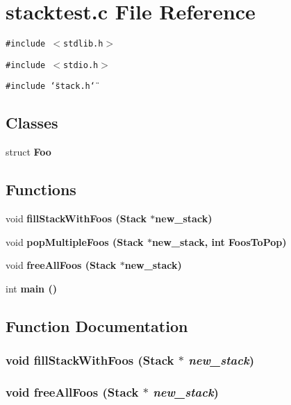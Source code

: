\section{stacktest.c File Reference}
\label{stacktest_8c}
{\tt \#include $<$stdlib.h$>$}\par
{\tt \#include $<$stdio.h$>$}\par
{\tt \#include \char`\"{}stack.h\char`\"{}}\par
\subsection*{Classes}
\begin{CompactItemize}
\item 
struct \bf{Foo}
\end{CompactItemize}
\subsection*{Functions}
\begin{CompactItemize}
\item 
void \bf{fill\-Stack\-With\-Foos} (\bf{Stack} $\ast$new\_\-stack)
\item 
void \bf{pop\-Multiple\-Foos} (\bf{Stack} $\ast$new\_\-stack, int Foos\-To\-Pop)
\item 
void \bf{free\-All\-Foos} (\bf{Stack} $\ast$new\_\-stack)
\item 
int \bf{main} ()
\end{CompactItemize}


\subsection{Function Documentation}
\subsubsection{\setlength{\rightskip}{0pt plus 5cm}void fill\-Stack\-With\-Foos (\bf{Stack} $\ast$ {\em new\_\-stack})}\label{stacktest_8c_1f42a7e2ad96ed9484549bf1c74c8b75}


\subsubsection{\setlength{\rightskip}{0pt plus 5cm}void free\-All\-Foos (\bf{Stack} $\ast$ {\em new\_\-stack})}\label{stacktest_8c_882998297444641b31c5f8cbff47716c}


